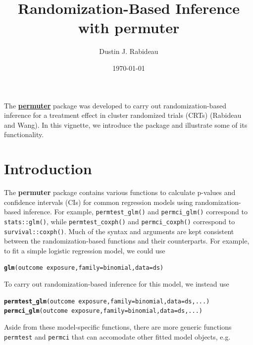 \documentclass[12pt]{article}\usepackage[]{graphicx}\usepackage[]{color}
\title{Randomization-Based Inference with \textbf{permuter}}
\author{Dustin J. Rabideau}
\date{\today}
\makeatletter
\newcommand{\hlopt}[1]{\textcolor[rgb]{0,0,0}{#1}}%
\newcommand{\hlstd}[1]{\textcolor[rgb]{0.345,0.345,0.345}{#1}}%
\newcommand{\hlkwc}[1]{\textcolor[rgb]{0.333,0.667,0.333}{#1}}%
\newcommand{\hlkwd}[1]{\textcolor[rgb]{0.737,0.353,0.396}{\textbf{#1}}}%
\newenvironment{kframe}{%
 \def\at@end@of@kframe{}%
 \ifinner\ifhmode%
  \def\at@end@of@kframe{\end{minipage}}%
  \begin{minipage}{\columnwidth}%
 \fi\fi%
 \def\FrameCommand##1{\hskip\@totalleftmargin \hskip-\fboxsep
 \colorbox{shadecolor}{##1}\hskip-\fboxsep
     \hskip-\linewidth \hskip-\@totalleftmargin \hskip\columnwidth}%
 \MakeFramed {\advance\hsize-\width
   \@totalleftmargin\z@ \linewidth\hsize
   \@setminipage}}%
 {\par\unskip\endMakeFramed%
 \at@end@of@kframe}
\newenvironment{knitrout}{}{} %
\makeatother
\begin{document}
\maketitle

The \href{https://github.com/djrabideau/permuter}{\textbf{permuter}} package was developed to carry out randomization-based inference for a treatment effect in cluster randomized trials (CRTs) (Rabideau and Wang). In this vignette, we introduce the package and illustrate some of its functionality.

\section{Introduction}
The \textbf{permuter} package contains various functions to calculate p-values and confidence intervals (CIs) for common regression models using randomization-based inference. For example, \texttt{permtest\_glm()} and \texttt{permci\_glm()} correspond to \texttt{stats::glm()}, while \texttt{permtest\_coxph()} and \texttt{permci\_coxph()} correspond to \texttt{survival::coxph()}. Much of the syntax and arguments are kept consistent between the randomization-based functions and their counterparts. For example, to fit a simple logistic regression model, we could use
\begin{knitrout}
\color{fgcolor}\begin{kframe}
\begin{alltt}
\hlkwd{glm}\hlstd{(outcome} \hlopt{~} \hlstd{exposure,} \hlkwc{family} \hlstd{= binomial,} \hlkwc{data} \hlstd{= ds)}
\end{alltt}
\end{kframe}
\end{knitrout}
\noindent To carry out randomization-based inference for this model, we instead use
\begin{knitrout}
\color{fgcolor}\begin{kframe}
\begin{alltt}
\hlkwd{permtest_glm}\hlstd{(outcome} \hlopt{~} \hlstd{exposure,} \hlkwc{family} \hlstd{= binomial,} \hlkwc{data} \hlstd{= ds, ...)}
\hlkwd{permci_glm}\hlstd{(outcome} \hlopt{~} \hlstd{exposure,} \hlkwc{family} \hlstd{= binomial,} \hlkwc{data} \hlstd{= ds, ...)}
\end{alltt}
\end{kframe}
\end{knitrout}
\noindent Aside from these model-specific functions, there are more generic functions \texttt{permtest} and \texttt{permci} that can accomodate other fitted model objects, e.g.
\end{document}
